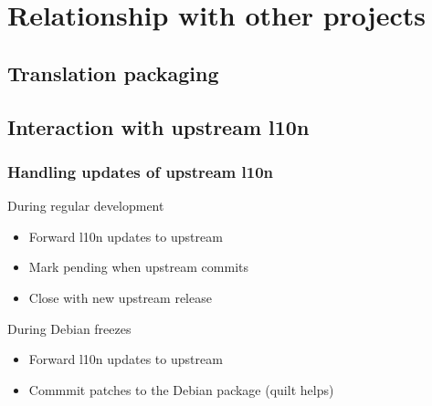 \documentclass{beamer}
\begin{document}

\section{Relationship with other projects}

\subsection{Translation packaging}

\begin{frame}
  \frametitle{}
\end{frame}

\subsection{Interaction with upstream l10n}

\begin{frame}
  \frametitle{Handling updates of upstream l10n}
	\begin{block}
		{During regular development}
		\begin{itemize}
		\item
			Forward l10n updates to upstream
		\item
			Mark pending when upstream commits
		\item
			Close with new upstream release
		\end{itemize}
	\end{block}
	\begin{block}
		{During Debian freezes}
		\begin{itemize}
		\item
			Forward l10n updates to upstream
		\item
			Commmit patches to the Debian package (quilt helps)
		\end{itemize}
	\end{block}
\end{frame}
\end{document}
